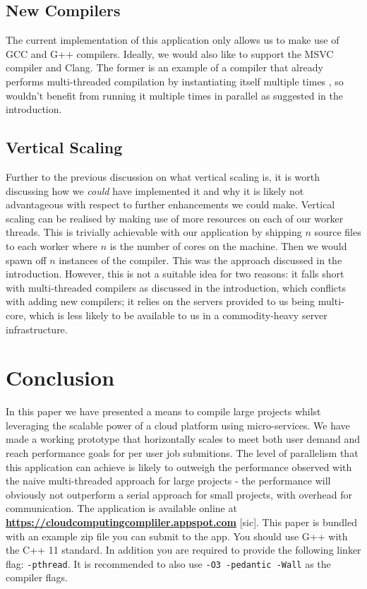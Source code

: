 \documentclass[conference]{IEEEtran}
\begin{document}
\subsection{New Compilers}
The current implementation of this application only allows us to make use of GCC
and G++ compilers. Ideally, we would also like to support the MSVC compiler and
Clang. The former is an example of a compiler that already performs
multi-threaded compilation by instantiating itself multiple times \cite{MSVC},
so wouldn't benefit from running it multiple times in parallel as suggested in
the introduction.
\subsection{Vertical Scaling}
Further to the previous discussion on what vertical scaling is, it is worth
discussing how we \emph{could} have implemented it and why it is likely not
advantageous with respect to further enhancements we could make. Vertical
scaling can be realised by making use of more resources on each of our worker
threads. This is trivially achievable with our application by shipping $n$
source files to each worker where $n$ is the number of cores on the machine.
Then we would spawn off $n$ instances of the compiler. This was the approach
discussed in the introduction. However, this is not a suitable idea for two
reasons: it falls short with multi-threaded compilers as
discussed in the introduction, which conflicts with adding new compilers; it
relies on the servers provided to us being multi-core, which is less likely to
be available to us in a commodity-heavy server infrastructure.
\section{Conclusion}
In this paper we have presented a means to compile large projects whilst
leveraging the scalable power of a cloud platform using micro-services. We have
made a working prototype that horizontally scales to
meet both user demand and reach performance goals for per user job submitions.
The level of parallelism that this application can achieve is likely to outweigh
the performance observed with the naive multi-threaded approach for large
projects - the performance will obviously not outperform a serial approach for
small projects, with overhead for communication.
The application is available online at
\textbf{\url{https://cloudcomputingcompliler.appspot.com}} [sic].
This paper is bundled with an example zip file you can submit to the app. You
should use G++ with the C++ 11 standard. In addition you are required to provide
the following linker flag: \texttt{-pthread}. It is recommended to also use
\texttt{-O3 -pedantic -Wall} as the compiler flags.
\end{document}
